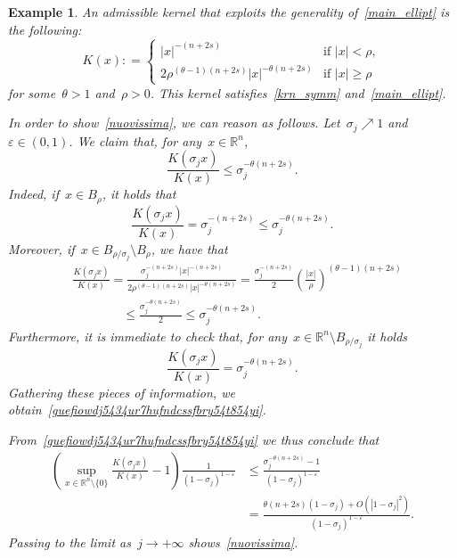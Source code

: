 \documentclass[10pt,a4paper]{amsart}
\newtheorem{example}[theorem]{Example}
\numberwithin{equation}{section}
\newcommand{\R}{\mathbb{R}}
\renewcommand{\epsilon}{\varepsilon}
\begin{document}
\begin{example}{\rm
An admissible kernel that exploits the generality of~\eqref{main_ellipt} is the following:
\begin{equation}\label{khvfvvcd}
K(x): = \begin{cases}
| x |^{-(n+2s)} & \mbox{if } | x | < \rho, \\
2 \rho^{(\theta-1)(n+2s)}| x |^{-\theta(n+2s)} & \mbox{if } | x| \geq \rho
\end{cases}
\end{equation}
for some~$\theta>1$ and~$\rho>0$. This kernel satisfies~\eqref{krn_symm} and~\eqref{main_ellipt}. 

In order to show~\eqref{nuovissima}, we can reason as follows. Let~$\sigma_j \nearrow 1$ and~$\epsilon \in (0,1)$. 
We claim that, for any~$x\in\R^n$,
\begin{equation}\label{guefiowdj5434ur7hufndcssfbry54t854yi}
\frac{K(\sigma_j x)}{K(x)}\le \sigma_j^{-\theta(n+2s)}.
\end{equation}
Indeed, if~$ x  \in{B_{\rho}}$, it holds that
\begin{equation*}
\frac{K(\sigma_j x)}{K(x)}= \sigma_j^{-(n+2s)} \leq \sigma_j^{-\theta(n+2s)}.
\end{equation*}
Moreover, if~$ x \in B_{\rho /\sigma_j} \setminus {B_{\rho}}$, we have that
\begin{equation*}
\begin{split}&
\frac{K(\sigma_j x)}{K(x)}  = \frac{\sigma_j^{-(n+2s)}| x |^{-(n+2s)}}{2 \rho^{(\theta-1)(n+2s)}| x|^{-\theta(n+2s)}} = \frac{\sigma_j^{-(n+2s)}}{2} \left(\frac{| x |}{\rho}\right)^{(\theta-1)(n+2s)} \\
&\qquad\qquad \leq \frac{\sigma_j^{-\theta(n+2s)}}{2} \leq\sigma_j^{-\theta(n+2s)}.
\end{split}
\end{equation*}
Furthermore, it is immediate to check that, for any~$ x \in \R^n \setminus B_{\rho /\sigma_j}$ it holds
\[\frac{K(\sigma_j x)}{K(x)}  =\sigma_j^{-\theta(n+2s)}.\]
Gathering these pieces of information, we obtain~\eqref{guefiowdj5434ur7hufndcssfbry54t854yi}.

{F}rom~\eqref{guefiowdj5434ur7hufndcssfbry54t854yi} we thus conclude that
\[
\begin{split}
\left(\sup_{x \in \R^n \setminus\{0\}} \frac{K(\sigma_j x)}{K(x)} -1\right) \frac{1}{(1-\sigma_j)^{1-\epsilon}}&
\leq \frac{\sigma_j^{-\theta(n+2s)}-1}{(1-\sigma_j)^{1-\epsilon}} \\&= \frac{\theta(n+2s)(1-\sigma_j)+O(| 1 -\sigma_j|^2)}{(1-\sigma_j)^{1-\epsilon}}.
\end{split}
\]
Passing to the limit as~$j \to +\infty$ shows~\eqref{nuovissima}.
}
\end{example}
\end{document}
